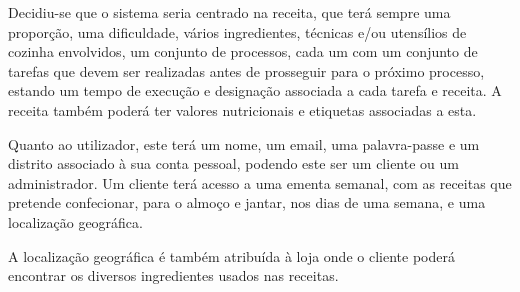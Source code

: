Decidiu-se que o sistema seria centrado na receita, que terá sempre uma proporção, uma dificuldade, vários ingredientes, técnicas e/ou utensílios de cozinha envolvidos, um conjunto de processos, cada um com um conjunto de tarefas que devem ser realizadas antes de prosseguir para o próximo processo, estando um tempo de execução e designação associada a cada tarefa e receita.
A receita também poderá ter valores nutricionais e etiquetas associadas a esta.

Quanto ao utilizador, este terá um nome, um email, uma palavra-passe e um distrito associado à sua conta pessoal, podendo este ser um cliente ou um administrador. Um cliente terá acesso a uma ementa semanal, com as receitas que pretende confecionar, para o almoço e jantar, nos dias de uma semana, e uma localização geográfica. 

A localização geográfica é também atribuída à loja onde o cliente poderá encontrar os diversos ingredientes usados nas receitas.











